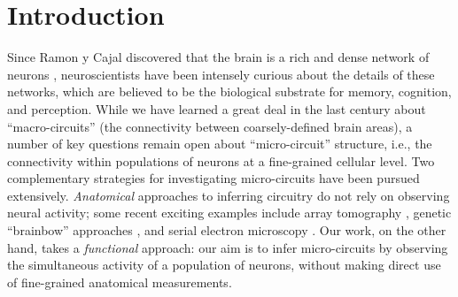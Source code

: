 \documentclass[aoas,preprint]{imsart}
\begin{document}
\section{Introduction}
\label{intro}
Since Ramon y Cajal discovered that the brain is a rich and dense
network of neurons \cite{RamonyCajal04,RamonyCajal23}, neuroscientists
have been intensely curious about the details of these networks, which
are believed to be the biological substrate for memory, cognition, and
perception. While we have learned a great deal in the last century
about ``macro-circuits'' (the connectivity between coarsely-defined
brain areas), a number of key questions remain open about
``micro-circuit'' structure, i.e., the connectivity within populations
of neurons at a fine-grained cellular level.  Two complementary
strategies for investigating micro-circuits have been pursued
extensively.  \emph{Anatomical} approaches to inferring circuitry do
not rely on observing neural activity; some recent exciting examples
include array tomography \cite{MichevaSmith07}, genetic ``brainbow''
approaches \cite{Brainbow07}, and serial electron microscopy
\cite{Briggman2006}. Our work, on the other hand, takes a
\emph{functional} approach: our aim is to infer micro-circuits by
observing the simultaneous activity of a population of neurons,
without making direct use of fine-grained anatomical measurements.
\end{document}
